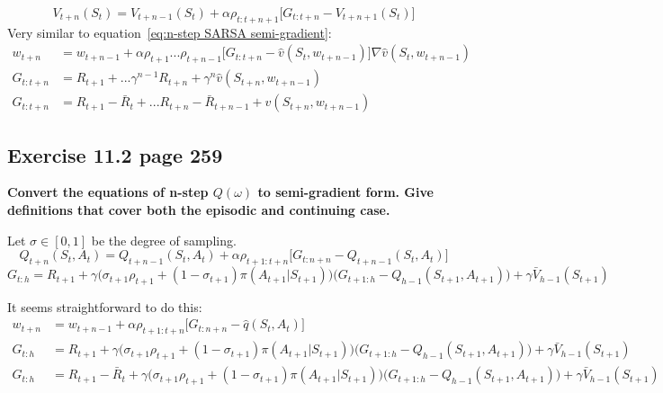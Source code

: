 \begin{equation}
V_{t+n}(S_t) = V_{t+n-1}(S_t) + \alpha \rho_{t:t+n+1} \Big[ G_{t:t+n} - V_{t+n+1}(S_t) \Big]
\tag{equation 7.9 from the book page 148}
\end{equation}
Very similar to equation~\ref{eq:n-step SARSA semi-gradient}:
\begin{equation}
\begin{split}
w_{t+n} & = w_{t+n-1} + \alpha \rho_{t+1} ... \rho_{t+n-1}\Big[ G_{t:t+n}-\hat{v}(S_t, w_{t+n-1}) \Big] \nabla \hat{v}(S_t, w_{t+n-1}) \\
G_{t:t+n} & = R_{t+1} + ... \gamma^{n-1}R_{t+n} + \gamma^n \hat{v}(S_{t+n}, w_{t+n-1}) \\
G_{t:t+n} & = R_{t+1} - \bar{R}_{t} + ... R_{t+n} - \bar{R}_{t+n-1} +  \hat{v}(S_{t+n}, w_{t+n-1})
\end{split}
\end{equation}

\subsection{Exercise 11.2 page 259}
\textbf{Convert the equations of n-step $Q(\omega)$ to semi-gradient form. Give definitions that cover both the episodic and continuing case.}

Let $\sigma \in [0, 1]$ be the degree of sampling.
\begin{equation}
Q_{t+n}(S_t, A_t) = Q_{t+n-1}(S_t, A_t) + \alpha \rho_{t+1:t+n} \big[ G_{t:n+n} - Q_{t+n-1}(S_t, A_t) \big]
\tag{equation 7.11 handbook page 149}
\end{equation}
\begin{equation}
G_{t:h} = R_{t+1} + \gamma \Big( \sigma_{t+1}\rho_{t+1} + (1-\sigma_{t+1})\pi(A_{t+1}|S_{t+1}) \Big) \Big( G_{t+1:h} -Q_{h-1}(S_{t+1}, A_{t+1}) \Big) + \gamma \bar{V}_{h-1}(S_{t+1})
\tag{equation 7.17 handbook page 155, $Q(\sigma)$}
\end{equation}

It seems straightforward to do this:
\begin{equation}
\begin{split}
w_{t+n} & = w_{t+n-1} + \alpha \rho_{t+1:t+n}\big[ G_{t:n+n} - \hat{q}(S_t, A_t) \big]\\
G_{t:h} & = R_{t+1} + \gamma \Big( \sigma_{t+1}\rho_{t+1} + (1-\sigma_{t+1})\pi(A_{t+1}|S_{t+1}) \Big) \Big( G_{t+1:h} -Q_{h-1}(S_{t+1}, A_{t+1}) \Big) + \gamma \bar{V}_{h-1}(S_{t+1}) \\
G_{t:h} & = R_{t+1} -\bar{R}_t + \gamma \Big( \sigma_{t+1}\rho_{t+1} + (1-\sigma_{t+1})\pi(A_{t+1}|S_{t+1}) \Big) \Big( G_{t+1:h} -Q_{h-1}(S_{t+1}, A_{t+1}) \Big) + \gamma \bar{V}_{h-1}(S_{t+1}) \\
\end{split}
\end{equation}

